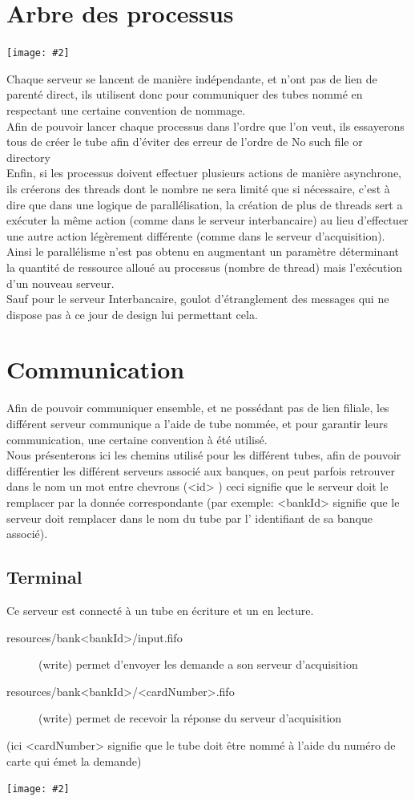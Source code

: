 \documentclass[french, a4paper, 12pt, titlepage]{article}
\newcommand{\graph}[2]{
\medskip
	\begin{center}
		\texttt{[image: \#2]}
	\end{center}
\medskip
}
\begin{document}
\section{Arbre des processus}
\graph{0.6}{arbre}
Chaque serveur se lancent de manière indépendante, et n'ont pas de lien de parenté direct, ils utilisent donc pour communiquer des tubes nommé en respectant une certaine convention de nommage.\\
\noindent
Afin de pouvoir lancer chaque processus dans l'ordre que l'on veut, ils essayerons tous de créer le tube afin d'éviter des erreur de l'ordre de \og No such file or directory \fg\\
\noindent
Enfin, si les processus doivent effectuer plusieurs actions de manière asynchrone, ils créerons des threads dont le nombre ne sera limité que si nécessaire,
c'est à dire que dans une logique de parallélisation, la création de plus de threads sert a exécuter la même action (comme dans le serveur interbancaire) au lieu d'effectuer une autre action légèrement différente (comme dans le serveur d'acquisition).\\
\noindent
Ainsi le parallélisme n'est pas obtenu en augmentant un paramètre déterminant la quantité de ressource alloué au processus (nombre de thread) mais l'exécution d'un nouveau serveur.\\
\noindent
Sauf pour le serveur Interbancaire, goulot d'étranglement des messages qui ne dispose pas à ce jour de design lui permettant cela.


\section{Communication}
Afin de pouvoir communiquer ensemble, et ne possédant pas de lien filiale, les différent serveur communique a l'aide de tube nommée, et pour garantir leurs communication, une certaine convention à été utilisé.\\
\noindent
Nous présenterons ici les chemins utilisé pour les différent tubes, afin de pouvoir différentier les différent serveurs associé aux banques, on peut parfois retrouver dans le nom un mot entre chevrons (\og <id> \fg) ceci signifie que le serveur doit le remplacer par la donnée correspondante (par exemple: <bankId> signifie que le serveur doit remplacer dans le nom du tube par l' identifiant de sa banque associé).

\subsection{Terminal}
Ce serveur est connecté à un tube en écriture et un en lecture.
\begin{description}
	\item[resources/bank<bankId>/input.fifo] (write) permet d'envoyer les demande a son serveur d'acquisition
	\item[resources/bank<bankId>/<cardNumber>.fifo] (write) permet de recevoir la réponse du serveur d'acquisition
\end{description}
\noindent
(ici <cardNumber> signifie que le tube doit être nommé à l'aide du numéro de carte qui émet la demande)
\graph{0.5}{terminal}
\end{document}
